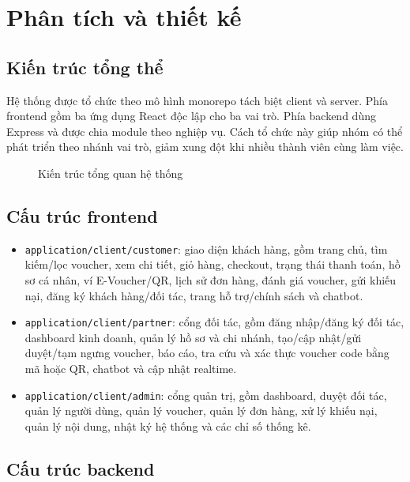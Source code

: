 \chapter{Phân tích và thiết kế}

\section{Kiến trúc tổng thể}

Hệ thống được tổ chức theo mô hình monorepo tách biệt client và server. Phía frontend gồm ba ứng dụng React độc lập cho ba vai trò. Phía backend dùng Express và được chia module theo nghiệp vụ. Cách tổ chức này giúp nhóm có thể phát triển theo nhánh vai trò, giảm xung đột khi nhiều thành viên cùng làm việc.

\begin{figure}[H]
\centering
{}
\caption{Kiến trúc tổng quan hệ thống}
\end{figure}

\section{Cấu trúc frontend}

\begin{itemize}[leftmargin=1.2cm]
    \item \texttt{application/client/customer}: giao diện khách hàng, gồm trang chủ, tìm kiếm/lọc voucher, xem chi tiết, giỏ hàng, checkout, trạng thái thanh toán, hồ sơ cá nhân, ví E-Voucher/QR, lịch sử đơn hàng, đánh giá voucher, gửi khiếu nại, đăng ký khách hàng/đối tác, trang hỗ trợ/chính sách và chatbot.
    \item \texttt{application/client/partner}: cổng đối tác, gồm đăng nhập/đăng ký đối tác, dashboard kinh doanh, quản lý hồ sơ và chi nhánh, tạo/cập nhật/gửi duyệt/tạm ngưng voucher, báo cáo, tra cứu và xác thực voucher code bằng mã hoặc QR, chatbot và cập nhật realtime.
    \item \texttt{application/client/admin}: cổng quản trị, gồm dashboard, duyệt đối tác, quản lý người dùng, quản lý voucher, quản lý đơn hàng, xử lý khiếu nại, quản lý nội dung, nhật ký hệ thống và các chỉ số thống kê.
\end{itemize}

\section{Cấu trúc backend}

